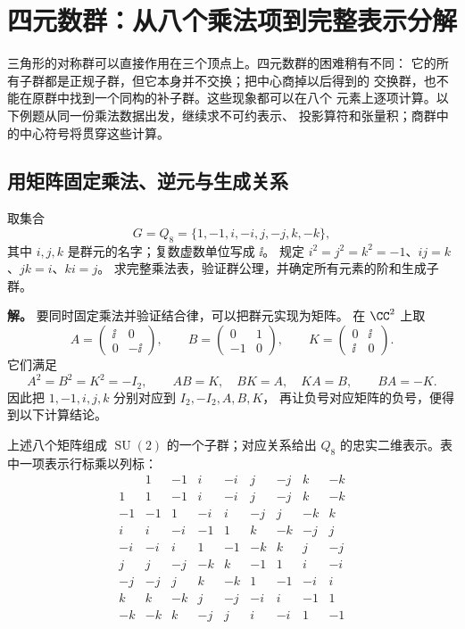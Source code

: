 \section{四元数群：从八个乘法项到完整表示分解}
\label{sec:q8-comprehensive}

三角形的对称群可以直接作用在三个顶点上。四元数群的困难稍有不同：
它的所有子群都是正规子群，但它本身并不交换；把中心商掉以后得到的
交换群，也不能在原群中找到一个同构的补子群。这些现象都可以在八个
元素上逐项计算。以下例题从同一份乘法数据出发，继续求不可约表示、
投影算符和张量积；商群中的中心符号将贯穿这些计算。

\subsection{用矩阵固定乘法、逆元与生成关系}

\begin{exbox}[八个元素的群结构]
取集合
\[
G=Q_8=\{1,-1,i,-i,j,-j,k,-k\},
\]
其中 $i,j,k$ 是群元的名字；复数虚数单位写成 $\ii$。
规定 $i^2=j^2=k^2=-1$、$ij=k$、$jk=i$、$ki=j$。
求完整乘法表，验证群公理，并确定所有元素的阶和生成子群。
\end{exbox}

\textbf{解。} 要同时固定乘法并验证结合律，可以把群元实现为矩阵。
在 $\CC^2$ 上取
\[
A=\begin{pmatrix}\ii&0\\0&-\ii\end{pmatrix},
\qquad B=\begin{pmatrix}0&1\\-1&0\end{pmatrix},
\qquad K=\begin{pmatrix}0&\ii\\\ii&0\end{pmatrix}.
\]
它们满足
\[
A^2=B^2=K^2=-I_2,
\qquad AB=K,\quad BK=A,\quad KA=B,
\qquad BA=-K.
\]
因此把 $1,-1,i,j,k$ 分别对应到 $I_2,-I_2,A,B,K$，
再让负号对应矩阵的负号，便得到以下计算结论。

\begin{proposition}[$Q_8$ 的矩阵实现与乘法表]
\label{prop:q8-concrete-multiplication}
上述八个矩阵组成 $\operatorname{SU}(2)$ 的一个子群；对应关系给出
$Q_8$ 的忠实二维表示。表中一项表示行标乘以列标：
\[
\begin{array}{c|rrrrrrrr}
 &1&-1&i&-i&j&-j&k&-k\\\hline
1&1&-1&i&-i&j&-j&k&-k\\
-1&-1&1&-i&i&-j&j&-k&k\\
i&i&-i&-1&1&k&-k&-j&j\\
-i&-i&i&1&-1&-k&k&j&-j\\
j&j&-j&-k&k&-1&1&i&-i\\
-j&-j&j&k&-k&1&-1&-i&i\\
k&k&-k&j&-j&-i&i&-1&1\\
-k&-k&k&-j&j&i&-i&1&-1
\end{array}
\]
\end{proposition}

